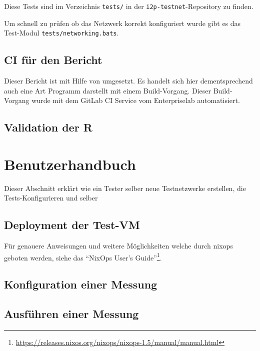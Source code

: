Diese Tests sind im Verzeichnis \lstinline|tests/| in der \lstinline|i2p-testnet|-Repository zu finden.

Um schnell zu prüfen ob das Netzwerk korrekt konfiguriert wurde gibt es das Test-Modul \lstinline|tests/networking.bats|.

\subsection{CI für den Bericht}

Dieser Bericht ist mit Hilfe von \LaTex umgesetzt.
Es handelt sich hier dementsprechend auch eine Art Programm darstellt mit einem Build-Vorgang.
Dieser Build-Vorgang wurde mit dem GitLab CI Service vom Enterpriselab automatisiert.

\subsection{Validation der R}

\section{Benutzerhandbuch}

Dieser Abschnitt erklärt wie ein Tester selber neue Testnetzwerke erstellen, die Tests-Konfigurieren und selber

\subsection{Deployment der Test-VM}

Für genauere Anweisungen und weitere Möglichkeiten welche durch nixops geboten werden, siehe das ``NixOps User's Guide''\footnote{\url{https://releases.nixos.org/nixops/nixops-1.5/manual/manual.html}}.


\subsection{Konfiguration einer Messung}

\subsection{Ausführen einer Messung}
